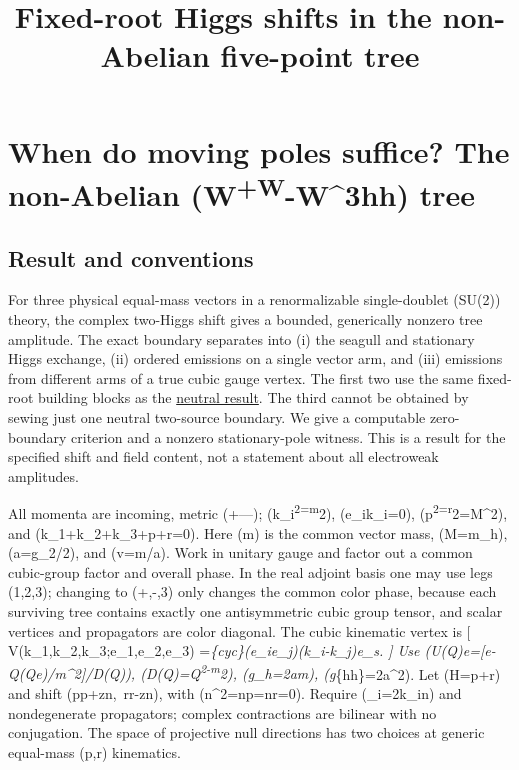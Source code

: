 \documentclass[
]{article}
\title{Fixed-root Higgs shifts in the non-Abelian five-point tree}
\author{}
\date{}
\begin{document}
\maketitle

\section{\texorpdfstring{When do moving poles suffice? The non-Abelian
(W\textsuperscript{+W}-W\^{}3hh)
tree}{When do moving poles suffice? The non-Abelian (W+W-W\^{}3hh) tree}}\label{when-do-moving-poles-suffice-the-non-abelian-ww-w3hh-tree}

\subsection{Result and conventions}\label{result-and-conventions}

For three physical equal-mass vectors in a renormalizable single-doublet
(SU(2)) theory, the complex two-Higgs shift gives a bounded, generically
nonzero tree amplitude. The exact boundary separates into (i) the
seagull and stationary Higgs exchange, (ii) ordered emissions on a
single vector arm, and (iii) emissions from different arms of a true
cubic gauge vertex. The first two use the same fixed-root building
blocks as the
\href{../su2-fixed-root-boundary/OffShell_Polarization_Boundary.md}{neutral
result}. The third cannot be obtained by sewing just one neutral
two-source boundary. We give a computable zero-boundary criterion and a
nonzero stationary-pole witness. This is a result for the specified
shift and field content, not a statement about all electroweak
amplitudes.

All momenta are incoming, metric (+---); (k\_i\textsuperscript{2=m}2),
(e\_i\cdot k\_i=0), (p\textsuperscript{2=r}2=M\^{}2), and
(k\_1+k\_2+k\_3+p+r=0). Here (m) is the common vector mass, (M=m\_h),
(a=g\_2/2), and (v=m/a). Work in unitary gauge and factor out a common
cubic-group factor and overall phase. In the real adjoint basis one may
use legs (1,2,3); changing to (+,-,3) only changes the common color
phase, because each surviving tree contains exactly one antisymmetric
cubic group tensor, and scalar vertices and propagators are color
diagonal. The cubic kinematic vertex is {[}
V(k\_1,k\_2,k\_3;e\_1,e\_2,e\_3)
=\sum\emph{\{\rm cyc\}(e\_i\cdot e\_j)(k\_i-k\_j)\cdot e\_s. {]} Use
(U(Q)e={[}e-Q(Q\cdot e)/m\^{}2{]}/D(Q)), (D(Q)=Q\textsuperscript{2-m}2),
(g\_h=2am), (g}\{hh\}=2a\^{}2). Let (H=p+r) and shift
(p\mapsto p+zn,~r\mapsto r-zn), with (n\^{}2=n\cdot p=n\cdot r=0).
Require (\ell\_i=2k\_i\cdot n) and nondegenerate propagators;
complex contractions are bilinear with no conjugation. The space of
projective null directions has two choices at generic equal-mass (p,r)
kinematics.
\end{document}

